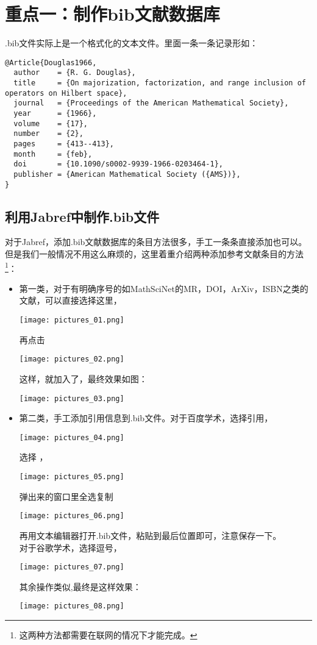 \documentclass[cn,geye,cyan,normal,14pt]{elegantnote}
\begin{document}
\section{重点一：制作bib文献数据库}
.bib文件实际上是一个格式化的文本文件。里面一条一条记录形如：
\begin{lstlisting}
@Article{Douglas1966,
  author    = {R. G. Douglas},
  title     = {On majorization, factorization, and range inclusion of operators on Hilbert space},
  journal   = {Proceedings of the American Mathematical Society},
  year      = {1966},
  volume    = {17},
  number    = {2},
  pages     = {413--413},
  month     = {feb},
  doi       = {10.1090/s0002-9939-1966-0203464-1},
  publisher = {American Mathematical Society ({AMS})},
}
\end{lstlisting}
\subsection{利用Jabref中制作.bib文件}
	对于Jabref，添加.bib文献数据库的条目方法很多，手工一条条直接添加也可以。但是我们一般情况不用这么麻烦的，这里着重介绍两种添加参考文献条目的方法\footnote{这两种方法都需要在联网的情况下才能完成。}：
	\begin{itemize}
		\item 第一类，对于有明确序号的如MathSciNet的MR，DOI，ArXiv，ISBN之类的文献，可以直接选择这里，
			\begin{center}
				\texttt{[image: pictures\_01.png]}
			\end{center}
			再点击
			\begin{center}
				\texttt{[image: pictures\_02.png]}
			\end{center}
			这样，就加入了，最终效果如图：
			\begin{center}
			\texttt{[image: pictures\_03.png]}
			\end{center}
		\item 第二类，手工添加引用信息到.bib文件。对于百度学术，选择引用，
			\begin{center}
			\texttt{[image: pictures\_04.png]}
			\end{center}
			选择 \BibTeX，
			\begin{center}
			\texttt{[image: pictures\_05.png]}
			\end{center}
			弹出来的窗口里全选复制
			\begin{center}
			\texttt{[image: pictures\_06.png]}
			\end{center}
			再用文本编辑器打开.bib文件，粘贴到最后位置即可，注意保存一下。\\
对于谷歌学术，选择逗号，
			\begin{center}
			\texttt{[image: pictures\_07.png]}
			\end{center}
			其余操作类似,最终是这样效果：
			\begin{center}
			\texttt{[image: pictures\_08.png]}
			\end{center}
	\end{itemize}
\end{document}
